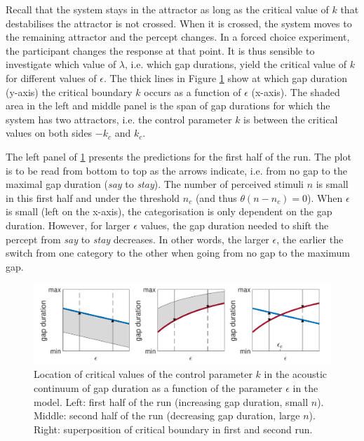 Recall that the system stays in the attractor as long as the critical value of $k$ that destabilises the attractor is not crossed. When it is crossed, the system moves to the remaining attractor and the percept changes. In a forced choice experiment, the participant changes the response at that point. It is thus sensible to investigate which value of $\lambda$, i.e. which gap durations, yield the critical value of $k$ for different values of $\epsilon$. The thick lines in Figure \ref{fig:tuller_lambda_epsilon} show at which gap duration (y-axis) the critical boundary $k$ occurs as a function of $\epsilon$ (x-axis). The shaded area in the left and middle panel is the span of gap durations for which the system has two attractors, i.e. the control parameter $k$ is between the critical values on both sides $-k_c$ and $k_c$.

The left panel of \ref{fig:tuller_lambda_epsilon} presents the predictions for the first half of the run. The plot is to be read from bottom to top as the arrows indicate, i.e. from no gap to the maximal gap duration (\emph{say} to \emph{stay}). The number of perceived stimuli $n$ is small in this first half and under the threshold  $n_c$ (and thus $\theta(n-n_c) = 0$). When $\epsilon$ is small (left on the x-axis), the categorisation is only dependent on the gap duration. However, for larger $\epsilon$ values, the gap duration needed to shift the percept from \emph{say} to \emph{stay} decreases. In other words, the larger $\epsilon$, the earlier the switch from one category to the other when going from no gap to the maximum gap.

\begin{figure}[t]
	\includegraphics[width=\textwidth]{figures/ch3/tuller_lambda_epsilon_plane.pdf}
	\caption[Location of critical values of the control parameter $k$ in the acoustic continuum of gap duration as a function of the parameter $\epsilon$ in the \citet{Tulleretal1994} model.]{Location of critical values of the control parameter $k$ in the acoustic continuum of gap duration as a function of the parameter $\epsilon$ in the \citet{Tulleretal1994} model. Left: first half of the run (increasing gap duration, small $n$). Middle: second half of the run (decreasing gap duration, large $n$). Right: superposition of critical boundary in first and second run.}
	\label{fig:tuller_lambda_epsilon}
\end{figure}

